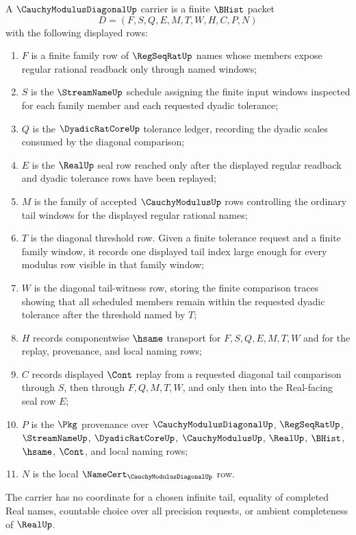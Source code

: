 \begin{definition}
\label{def:cauchy-modulus-diagonal-carrier}
A $\CauchyModulusDiagonalUp$ carrier is a finite $\BHist$ packet
$$
D=(F,S,Q,E,M,T,W,H,C,P,N)
$$
with the following displayed rows:
\begin{enumerate}
\item $F$ is a finite family row of $\RegSeqRatUp$ names whose members expose regular rational readback only through named windows;
\item $S$ is the $\StreamNameUp$ schedule assigning the finite input windows inspected for each family member and each requested dyadic tolerance;
\item $Q$ is the $\DyadicRatCoreUp$ tolerance ledger, recording the dyadic scales consumed by the diagonal comparison;
\item $E$ is the $\RealUp$ seal row reached only after the displayed regular readback and dyadic tolerance rows have been replayed;
\item $M$ is the family of accepted $\CauchyModulusUp$ rows controlling the ordinary tail windows for the displayed regular rational names;
\item $T$ is the diagonal threshold row. Given a finite tolerance request and a finite family window, it records one displayed tail index large enough for every modulus row visible in that family window;
\item $W$ is the diagonal tail-witness row, storing the finite comparison traces showing that all scheduled members remain within the requested dyadic tolerance after the threshold named by $T$;
\item $H$ records componentwise $\hsame$ transport for $F,S,Q,E,M,T,W$ and for the replay, provenance, and local naming rows;
\item $C$ records displayed $\Cont$ replay from a requested diagonal tail comparison through $S$, then through $F,Q,M,T,W$, and only then into the Real-facing seal row $E$;
\item $P$ is the $\Pkg$ provenance over $\CauchyModulusDiagonalUp$, $\RegSeqRatUp$, $\StreamNameUp$, $\DyadicRatCoreUp$, $\CauchyModulusUp$, $\RealUp$, $\BHist$, $\hsame$, $\Cont$, and local naming rows;
\item $N$ is the local $\NameCert_{\CauchyModulusDiagonalUp}$ row.
\end{enumerate}
The carrier has no coordinate for a chosen infinite tail, equality of completed Real names, countable choice over all precision requests, or ambient completeness of $\RealUp$.
\end{definition}

